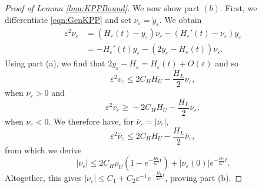\documentclass[10pt,a4paper]{amsart}
\begin{document}
\begin{proof}[Proof of Lemma \ref{lma:KPPBound}]
We now show part $(b)$. First, we differentiate \eqref{eqn:GenKPP} and set $\nu_\varepsilon=\dot{y}_\varepsilon$.  We obtain 
\begin{align*}
\varepsilon^{2}\dot{\nu}_\varepsilon&=(H_\varepsilon(t)-y_\varepsilon)\nu_\varepsilon-(H_\varepsilon'(t)-\nu_\varepsilon)y_\varepsilon\\
&=-H_\varepsilon'(t)y_\varepsilon-(2y_\varepsilon-H_\varepsilon(t))\nu_\varepsilon.
\end{align*}
Using part (a), we find that $2y_\varepsilon-H_\varepsilon=H_\varepsilon(t)+O(\varepsilon)$ and so
\[\varepsilon^{2}\dot{v}_\varepsilon\leq{}2C_HH_U-\frac{H_L}{2}\nu_\varepsilon,\]
when $\nu_\varepsilon>0$ and
\[\varepsilon^{2}\dot{v}_\varepsilon\geq{}-2C_HH_U-\frac{H_L}{2}\nu_\varepsilon,\]
when $\nu_\varepsilon<0$. We therefore have, for $\overline{\nu}_\varepsilon=|\nu_\varepsilon|$,
\[\varepsilon^2\overline{\nu}_\varepsilon\leq{}2C_HH_U-\frac{H_L}{2}\overline{\nu}_\varepsilon,\]
from which we derive
\[
|\nu_\varepsilon|\leq{}2C_H\rho_U\left(1-e^{-\frac{H_L}{2\varepsilon^2}t}\right)+|\nu_\varepsilon(0)|e^{-\frac{H_L}{2\varepsilon^2}t}.
\]
Altogether, this gives $|\nu_\varepsilon|\leq{}C_1+C_2\varepsilon^{-1}e^{-\frac{H_L}{2\varepsilon^2}t}$, proving part (b). 

\end{proof}
\end{document}
